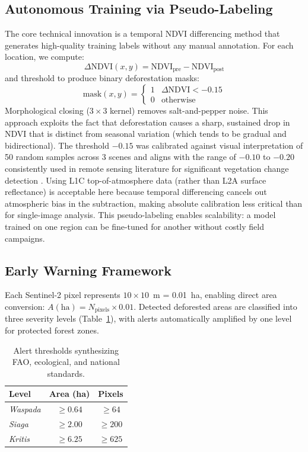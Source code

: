 \documentclass[10pt,a4paper,twocolumn]{article}
\begin{document}
\subsection{Autonomous Training via Pseudo-Labeling}
The core technical innovation is a temporal NDVI differencing
method that generates high-quality training labels without any
manual annotation. For each location, we compute:
\begin{equation}
\Delta\text{NDVI}(x,y) = \text{NDVI}_{\text{pre}} - \text{NDVI}_{\text{post}}
\end{equation}
and threshold to produce binary deforestation masks:
\begin{equation}
\text{mask}(x,y) = 
\begin{cases}
1 & \Delta\text{NDVI} < -0.15 \\
0 & \text{otherwise}
\end{cases}
\end{equation}
Morphological closing ($3\times3$ kernel) removes salt-and-pepper
noise. This approach exploits the fact that deforestation causes
a sharp, sustained drop in NDVI that is distinct from seasonal
variation (which tends to be gradual and bidirectional). The
threshold $-0.15$ was calibrated against visual interpretation of
50 random samples across 3 scenes and aligns with the range of
$-0.10$ to $-0.20$ consistently used in remote sensing literature
for significant vegetation change detection \cite{hansen2013high}.
Using L1C top-of-atmosphere data (rather than L2A surface
reflectance) is acceptable here because temporal differencing
cancels out atmospheric bias in the subtraction, making absolute
calibration less critical than for single-image analysis. This
pseudo-labeling enables scalability: a model trained on one region
can be fine-tuned for another without costly field campaigns.

\subsection{Early Warning Framework}
Each Sentinel-2 pixel represents $10\times10$~m = 0.01~ha, enabling
direct area conversion: $A(\text{ha}) = N_{\text{pixels}} \times 0.01$.
Detected deforested areas are classified into three severity levels
(Table~\ref{tab:thresholds}), with alerts automatically amplified
by one level for protected forest zones.

\begin{table}[ht]
\centering
\caption{Alert thresholds synthesizing FAO, ecological, and national
standards.}
\label{tab:thresholds}
\small
\begin{tabular}{lcc}
\toprule
Level & Area (ha) & Pixels \\
\midrule
\textit{Waspada} & $\ge 0.64$ & $\ge 64$ \\
\textit{Siaga}   & $\ge 2.00$ & $\ge 200$ \\
\textit{Kritis}  & $\ge 6.25$ & $\ge 625$ \\
\bottomrule
\end{tabular}
\end{table}
\end{document}
